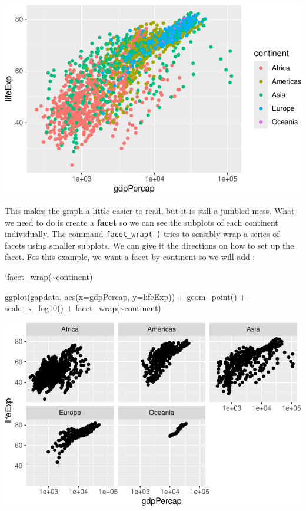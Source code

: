 \documentclass[
  letterpaper,
  DIV=11,
  numbers=noendperiod]{scrreprt}
\newenvironment{Shaded}{\begin{snugshade}}{\end{snugshade}}
\newcommand{\AttributeTok}[1]{\textcolor[rgb]{0.40,0.45,0.13}{#1}}
\newcommand{\FunctionTok}[1]{\textcolor[rgb]{0.28,0.35,0.67}{#1}}
\newcommand{\NormalTok}[1]{\textcolor[rgb]{0.00,0.23,0.31}{#1}}
\newcommand{\SpecialCharTok}[1]{\textcolor[rgb]{0.37,0.37,0.37}{#1}}
\begin{document}
\includegraphics{Advanced_Scatterplot_Techniques_files/figure-pdf/unnamed-chunk-16-1.pdf}

This makes the graph a little easier to read, but it is still a jumbled
mess. What we need to do is create a \textbf{facet} so we can see the
subplots of each continent individually. The command
\texttt{facet\_wrap(\ )} tries to sensibly wrap a series of facets using
smaller subplots. We can give it the directions on how to set up the
facet. Fos this example, we want a facet by continent so we will add :

`facet\_wrap(\textasciitilde continent)

\begin{Shaded}
\begin{Highlighting}[]
 \FunctionTok{ggplot}\NormalTok{(gapdata, }\FunctionTok{aes}\NormalTok{(}\AttributeTok{x=}\NormalTok{gdpPercap, }\AttributeTok{y=}\NormalTok{lifeExp)) }\SpecialCharTok{+}
  \FunctionTok{geom\_point}\NormalTok{() }\SpecialCharTok{+}
  \FunctionTok{scale\_x\_log10}\NormalTok{() }\SpecialCharTok{+}
  \FunctionTok{facet\_wrap}\NormalTok{(}\SpecialCharTok{\textasciitilde{}}\NormalTok{continent)}
\end{Highlighting}
\end{Shaded}

\includegraphics{Advanced_Scatterplot_Techniques_files/figure-pdf/unnamed-chunk-17-1.pdf}
\end{document}
